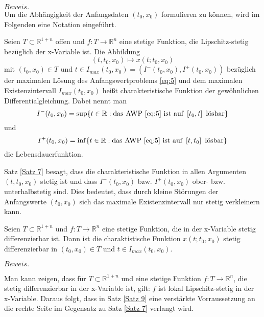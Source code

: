 $Beweis.$ \cite[67,68]{beckGewohnlicheDifferentialgleichungen2018}\\
Um die Abhängigkeit der Anfangsdaten $(t_0,x_0)$ formulieren zu können, wird im Folgenden eine Notation eingeführt.
\begin{definition}
    Seien $T \subset \mathbb{R}^{1+n}$ offen und $f:T \rightarrow \mathbb{R}^{n}$ eine stetige Funktion, die
    Lipschitz-stetig bezüglich der x-Variable ist. Die Abbildung
    \[
        (t, t_0, x_0) \mapsto x(t; t_0, x_0)
    \]
    mit $(t_0, x_0)\in T$ und $t \in I_{max}(t_0,x_0) = \left( I^{-}(t_0,x_0), I^{+}(t_0,x_0) \right)$ bezüglich der
    maximalen Lösung des Anfangswertproblems \eqref{eq:5} und dem maximalen Existenzintervall $I_{max}(t_0,x_0)$ heißt
    charakteristische Funktion der gewöhnlichen Differentialgleichung.
    Dabei nennt man 
    \[
        I^{-}(t_0,x_0)=\sup\{ t\in\mathbb{R}: \text{das AWP \eqref{eq:5} ist auf } \left[ t_0, t \right] \text{ lösbar}\}
    \] und
    \[
        I^{+}(t_0,x_0)=\inf\{ t\in\mathbb{R}: \text{das AWP \eqref{eq:5} ist auf } \left[ t, t_0 \right] \text{ lösbar}\}
    \]
    die Lebensdauerfunktion.
\end{definition}
Satz \ref{Satz 7} besagt, dass die charakteristische Funktion in allen Argumenten $(t, t_0, x_0)$ stetig ist und dass
$I^{-}(t_0,x_0)$ bzw. $I^{+}(t_0,x_0)$ ober- bzw. unterhalbstetig sind. Dies bedeutet, dass durch kleine Störungen der
Anfangswerte $(t_0,x_0)$ sich das maximale Existenzintervall nur stetig verkleinern kann.
\begin{satz}
    \label{Satz 9}
    Seien $T \subset \mathbb{R}^{1+n}$ und $f:T \rightarrow \mathbb{R}^{n}$ eine stetige Funktion, die in der x-Variable
    stetig differenzierbar ist. Dann ist die charaktistische Funktion $x(t; t_0, x_0)$ stetig differenzierbar in
    $(t_0, x_0) \in T$ und $t \in I_{max}(t_0, x_0)$.
\end{satz}
$Beweis.$ \cite[69,70]{beckGewohnlicheDifferentialgleichungen2018}\\
\begin{bem}
    Man kann zeigen, dass für $T \subset \mathbb{R}^{1+n}$ und eine stetige Funktion $f:T \rightarrow \mathbb{R}^{n}$,
    die stetig differenzierbar in der x-Variable ist, gilt: $f$ ist lokal Lipschitz-stetig in der x-Variable.
    Daraus folgt, dass in Satz \ref{Satz 9} eine verstärkte Vorraussetzung an die rechte Seite
    im Gegensatz zu Satz \ref{Satz 7} verlangt wird.
\end{bem}